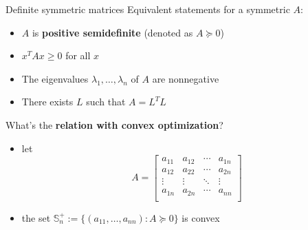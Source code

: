 \documentclass[aspectratio=169]{beamer}
\begin{document}
\begin{frame}{Definite symmetric matrices}
Equivalent statements for a symmetric $A$:
\begin{itemize}
\item
$A$ is \textbf{positive semidefinite} (denoted as $A \succeq 0$)
\item
$x^T A x \geq 0$ for all $x$
\item
The eigenvalues $\lambda_1, \ldots, \lambda_n$ of $A$ are nonnegative
\item
There exists $L$ such that $A = L^T L$
\end{itemize}
What's the \textbf{relation with convex optimization}?
\begin{itemize}
\item
let 
$$
A = \begin{bmatrix}
a_{11} & a_{12} & \cdots & a_{1n} \\
a_{12} & a_{22} & \cdots & a_{2n} \\
\vdots & \vdots & \ddots & \vdots \\
a_{1n} & a_{2n} & \cdots & a_{nn} \\
\end{bmatrix}
$$
\item
the set $\mathbb S_n^+ := \{ (a_{11},\dots, a_{nn}) : A \succeq 0 \}$ is convex
\end{itemize}
\end{frame}
\end{document}
